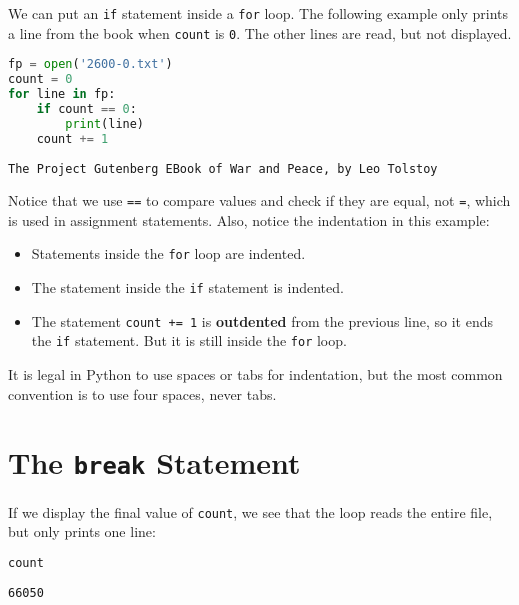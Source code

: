 We can put an \passthrough{\lstinline!if!} statement inside a
\passthrough{\lstinline!for!} loop. The following example only prints a
line from the book when \passthrough{\lstinline!count!} is
\passthrough{\lstinline!0!}. The other lines are read, but not
displayed.

\begin{lstlisting}[language=Python,style=source]
fp = open('2600-0.txt')
count = 0
for line in fp:
    if count == 0:
        print(line)
    count += 1
\end{lstlisting}

\begin{lstlisting}[style=output]
The Project Gutenberg EBook of War and Peace, by Leo Tolstoy
\end{lstlisting}

Notice that we use \passthrough{\lstinline!==!} to compare values and
check if they are equal, not \passthrough{\lstinline!=!}, which is used
in assignment statements. Also, notice the indentation in this example:

\begin{itemize}
\item
  Statements inside the \passthrough{\lstinline!for!} loop are indented.
\item
  The statement inside the \passthrough{\lstinline!if!} statement is
  indented.
\item
  The statement \passthrough{\lstinline!count += 1!} is
  \textbf{outdented} from the previous line, so it ends the
  \passthrough{\lstinline!if!} statement. But it is still inside the
  \passthrough{\lstinline!for!} loop.
\end{itemize}

It is legal in Python to use spaces or tabs for indentation, but the
most common convention is to use four spaces, never tabs.

\section{\texorpdfstring{The \texttt{break}
Statement}{The break Statement}}\label{the-break-statement}

If we display the final value of \passthrough{\lstinline!count!}, we see
that the loop reads the entire file, but only prints one line:

\begin{lstlisting}[language=Python,style=source]
count
\end{lstlisting}

\begin{lstlisting}[style=output]
66050
\end{lstlisting}

